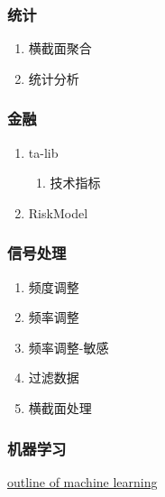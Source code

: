 \documentclass[11pt]{article}
\begin{document}
\subsubsection{统计}
\label{sec:orgheadline91}

\begin{enumerate}
\item 横截面聚合
\label{sec:orgheadline89}
\item 统计分析
\label{sec:orgheadline90}
\end{enumerate}
\subsubsection{金融}
\label{sec:orgheadline95}
\begin{enumerate}
\item ta-lib
\label{sec:orgheadline93}
\begin{enumerate}
\item 技术指标
\label{sec:orgheadline92}
\end{enumerate}
\item RiskModel
\label{sec:orgheadline94}
\end{enumerate}
\subsubsection{信号处理}
\label{sec:orgheadline101}
\begin{enumerate}
\item 频度调整
\label{sec:orgheadline96}
\item 频率调整
\label{sec:orgheadline97}
\item 频率调整-敏感
\label{sec:orgheadline98}
\item 过滤数据
\label{sec:orgheadline99}
\item 横截面处理
\label{sec:orgheadline100}
\end{enumerate}
\subsubsection{机器学习}
\label{sec:orgheadline110}
\href{https://en.wikipedia.org/wiki/Outline_of_machine_learning}{outline of machine learning}
\end{document}
